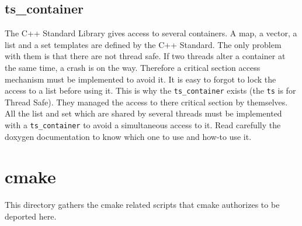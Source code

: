   \subsection{\textsf{ts\_container}}

  The C++ Standard Library gives access to several containers. A map, a vector, a
  list and a set templates are defined by the C++ Standard. The only problem with
  them is that there are not thread safe. If two threads alter a container at the
  same time, a crash is on the way. Therefore a critical section access mechanism
  must be implemented to avoid it. It is easy to forgot to lock the access to a
  list before using it. This is why the \texttt{ts\_container} exists (the
      \texttt{ts} is for Thread Safe). They managed the access to there critical
  section by themselves. All the list and set which are shared by several threads
  must be implemented with a \texttt{ts\_container} to avoid a simultaneous
  access to it. Read carefully the doxygen documentation to know which one to use
  and how-to use it.

\section{\textsf{cmake}}
\label{s:cmake}

This directory gathers the cmake related scripts that cmake authorizes to
be deported here.

